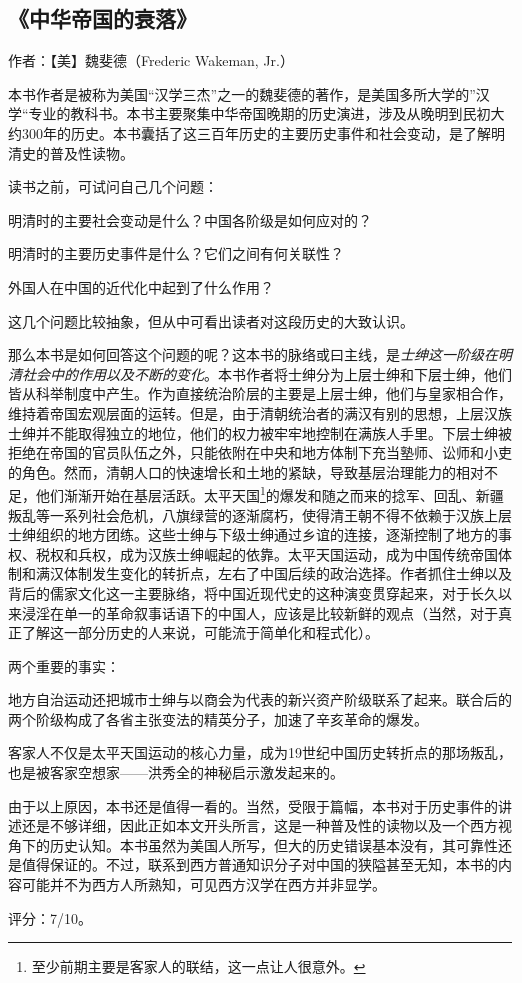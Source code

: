 \subsection{《中华帝国的衰落》}

作者：【美】魏斐德（Frederic Wakeman, Jr.）

本书作者是被称为美国“汉学三杰”之一的魏斐德的著作，是美国多所大学的”汉学“专业的教科书。本书主要聚集中华帝国晚期的历史演进，涉及从晚明到民初大约300年的历史。本书囊括了这三百年历史的主要历史事件和社会变动，是了解明清史的普及性读物。

读书之前，可试问自己几个问题：
\begin{itemize*}
	\item 明清时的主要社会变动是什么？中国各阶级是如何应对的？
	\item 明清时的主要历史事件是什么？它们之间有何关联性？
	\item 外国人在中国的近代化中起到了什么作用？
\end{itemize*}

这几个问题比较抽象，但从中可看出读者对这段历史的大致认识。

那么本书是如何回答这个问题的呢？这本书的脉络或曰主线，是\emph{士绅这一阶级在明清社会中的作用以及不断的变化}。本书作者将士绅分为上层士绅和下层士绅，他们皆从科举制度中产生。作为直接统治阶层的主要是上层士绅，他们与皇家相合作，维持着帝国宏观层面的运转。但是，由于清朝统治者的满汉有别的思想，上层汉族士绅并不能取得独立的地位，他们的权力被牢牢地控制在满族人手里。下层士绅被拒绝在帝国的官员队伍之外，只能依附在中央和地方体制下充当塾师、讼师和小吏的角色。然而，清朝人口的快速增长和土地的紧缺，导致基层治理能力的相对不足，他们渐渐开始在基层活跃。太平天国\footnote{至少前期主要是客家人的联结，这一点让人很意外。}的爆发和随之而来的捻军、回乱、新疆叛乱等一系列社会危机，八旗绿营的逐渐腐朽，使得清王朝不得不依赖于汉族上层士绅组织的地方团练。这些士绅与下级士绅通过乡谊的连接，逐渐控制了地方的事权、税权和兵权，成为汉族士绅崛起的依靠。太平天国运动，成为中国传统帝国体制和满汉体制发生变化的转折点，左右了中国后续的政治选择。作者抓住士绅以及背后的儒家文化这一主要脉络，将中国近现代史的这种演变贯穿起来，对于长久以来浸淫在单一的革命叙事话语下的中国人，应该是比较新鲜的观点（当然，对于真正了解这一部分历史的人来说，可能流于简单化和程式化）。

两个重要的事实：
\begin{itemize*}
	\item 地方自治运动还把城市士绅与以商会为代表的新兴资产阶级联系了起来。联合后的两个阶级构成了各省主张变法的精英分子，加速了辛亥革命的爆发。
	\item 客家人不仅是太平天国运动的核心力量，成为19世纪中国历史转折点的那场叛乱，也是被客家空想家——洪秀全的神秘启示激发起来的。
\end{itemize*}


由于以上原因，本书还是值得一看的。当然，受限于篇幅，本书对于历史事件的讲述还是不够详细，因此正如本文开头所言，这是一种普及性的读物以及一个西方视角下的历史认知。本书虽然为美国人所写，但大的历史错误基本没有，其可靠性还是值得保证的。不过，联系到西方普通知识分子对中国的狭隘甚至无知，本书的内容可能并不为西方人所熟知，可见西方汉学在西方并非显学。

评分：7/10。
